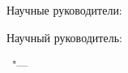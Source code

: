 %
\vspace{0pt plus4fill} %
\begin{flushright}
\ifdefined\supervisorTwoFio
Научные руководители:

\supervisorRegalia

\ifdefined\supervisorDead
\framebox{\supervisorFio}
\else
\supervisorFio
\fi

\supervisorTwoRegalia

\ifdefined\supervisorTwoDead
\framebox{\supervisorTwoFio}
\else
\supervisorTwoFio
\fi
\else
Научный руководитель:

\supervisorRegaliaShort

\ifdefined\supervisorDead
\framebox{\supervisorFio}
\else
\supervisorFio
\fi
\fi

\end{flushright}
%
\vspace{0pt plus4fill} %
{\centering\thesisCity\ "--- \thesisYear\par}
